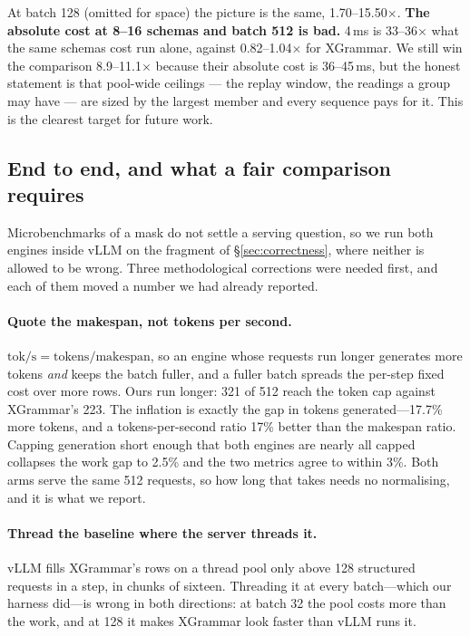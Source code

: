 \documentclass{article}
\begin{document}
At batch 128 (omitted for space) the picture is the same, 1.70--15.50$\times$.
\textbf{The absolute cost at 8--16 schemas and batch 512 is bad.} 4\,ms is
33--36$\times$ what the same schemas cost run alone, against 0.82--1.04$\times$
for XGrammar. We still win the comparison 8.9--11.1$\times$ because their
absolute cost is 36--45\,ms, but the honest statement is that pool-wide ceilings
--- the replay window, the readings a group may have --- are sized by the
largest member and every sequence pays for it. This is the clearest target for
future work.

\subsection{End to end, and what a fair comparison requires}
\label{sec:eval-e2e}

Microbenchmarks of a mask do not settle a serving question, so we run both
engines inside vLLM on the fragment of \S\ref{sec:correctness}, where neither
is allowed to be wrong. Three methodological corrections were needed first, and
each of them moved a number we had already reported.

\paragraph{Quote the makespan, not tokens per second.}
$\text{tok/s} = \text{tokens}/\text{makespan}$, so an engine whose requests run
longer generates more tokens \emph{and} keeps the batch fuller, and a fuller
batch spreads the per-step fixed cost over more rows. Ours run longer: 321 of
512 reach the token cap against XGrammar's 223. The inflation is exactly the
gap in tokens generated---17.7\% more tokens, and a tokens-per-second ratio
17\% better than the makespan ratio. Capping generation short enough that both
engines are nearly all capped collapses the work gap to 2.5\% and the two
metrics agree to within 3\%. Both arms serve the same 512 requests, so how long
that takes needs no normalising, and it is what we report.

\paragraph{Thread the baseline where the server threads it.} vLLM fills
XGrammar's rows on a thread pool only above 128 structured requests in a step,
in chunks of sixteen. Threading it at every batch---which our harness did---is
wrong in both directions: at batch 32 the pool costs more than the work, and at
128 it makes XGrammar look faster than vLLM runs it.
\end{document}
